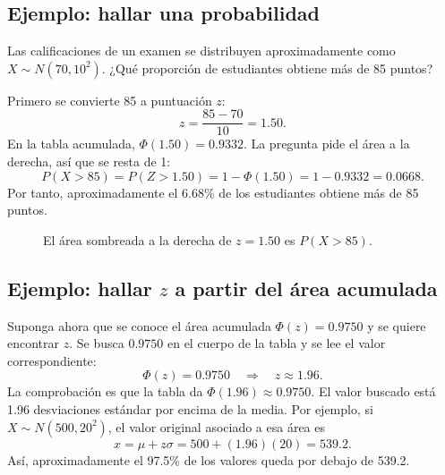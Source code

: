 \documentclass[11pt]{article}
\begin{document}
\subsection{Ejemplo: hallar una probabilidad}
Las calificaciones de un examen se distribuyen aproximadamente como $X\sim N(70,10^2)$. ¿Qué proporción de estudiantes obtiene más de 85 puntos?

Primero se convierte 85 a puntuación $z$:
\[
z=\frac{85-70}{10}=1.50.
\]
En la tabla acumulada, $\Phi(1.50)=0.9332$. La pregunta pide el área a la derecha, así que se resta de 1:
\[
P(X>85)=P(Z>1.50)=1-\Phi(1.50)=1-0.9332=0.0668.
\]
Por tanto, aproximadamente el 6.68\% de los estudiantes obtiene más de 85 puntos.

\begin{figure}[htbp]
\centering
{}
\caption{El área sombreada a la derecha de $z=1.50$ es $P(X>85)$.}
\label{fig:probabilidad}
\end{figure}

\subsection{Ejemplo: hallar $z$ a partir del área acumulada}
Suponga ahora que se conoce el área acumulada $\Phi(z)=0.9750$ y se quiere encontrar $z$. Se busca $0.9750$ en el cuerpo de la tabla y se lee el valor correspondiente:
\[
\Phi(z)=0.9750\quad\Longrightarrow\quad z\approx1.96.
\]
La comprobación es que la tabla da $\Phi(1.96)\approx0.9750$. El valor buscado está 1.96 desviaciones estándar por encima de la media. Por ejemplo, si $X\sim N(500,20^2)$, el valor original asociado a esa área es
\[
x=\mu+z\sigma=500+(1.96)(20)=539.2.
\]
Así, aproximadamente el 97.5\% de los valores queda por debajo de 539.2.
\end{document}
